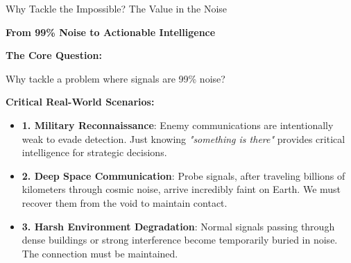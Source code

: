 \documentclass[aspectratio=169]{beamer}
\begin{document}
\begin{frame}{Why Tackle the Impossible? The Value in the Noise}
\begin{center}
\textcolor{zjutblue}{\Large \textbf{From 99\% Noise to Actionable Intelligence}}
\end{center}

\vspace{0.2cm}

\textbf{\textcolor{zjutred}{The Core Question:}}
\begin{center}
\textcolor{zjutred}{\normalsize Why tackle a problem where signals are 99\% noise?}
\end{center}

\vspace{0.2cm}
\textbf{\textcolor{zjutblue}{Critical Real-World Scenarios:}}

\begin{itemize}
\setlength{\itemsep}{0.15cm}
\item \textbf{\textcolor{zjutgreen}{1. Military Reconnaissance}}: Enemy communications are intentionally weak to evade detection. Just knowing \textit{"something is there"} provides critical intelligence for strategic decisions.

\item \textbf{\textcolor{zjutgreen}{2. Deep Space Communication}}: Probe signals, after traveling billions of kilometers through cosmic noise, arrive incredibly faint on Earth. We must recover them from the void to maintain contact.

\item \textbf{\textcolor{zjutgreen}{3. Harsh Environment Degradation}}: Normal signals passing through dense buildings or strong interference become temporarily buried in noise. The connection must be maintained.
\end{itemize}
\end{frame}
\end{document}
